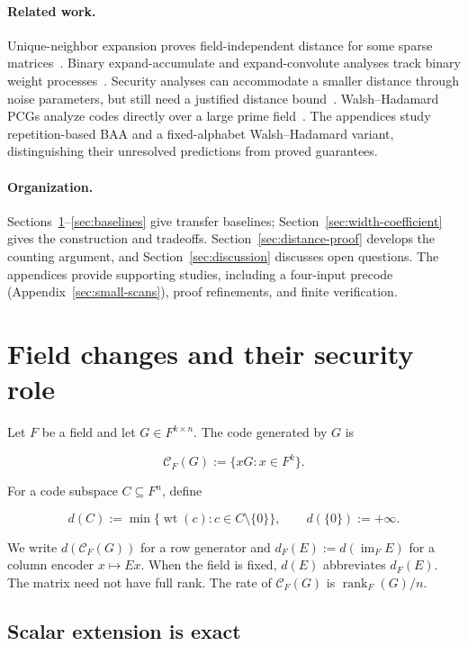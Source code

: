 \documentclass[runningheads,envcountsame,envcountsect]{llncs}
\newcommand{\wt}{\operatorname{wt}}
\newcommand{\rank}{\operatorname{rank}}
\newcommand{\cC}{\mathcal C}
\begin{document}
\paragraph{Related work.}
Unique-neighbor expansion proves
field-independent distance for some sparse matrices~\cite{silver21}.
Binary expand-accumulate and expand-convolute analyses track binary weight
processes~\cite{ea22,ec23}. Security analyses can accommodate a smaller
distance through noise parameters, but still need a justified distance
bound~\cite{silver21,stationary25}. Walsh--Hadamard PCGs analyze codes
directly over a large prime field~\cite{wht26}. The appendices study
repetition-based BAA and a fixed-alphabet Walsh--Hadamard variant, distinguishing
their unresolved predictions from proved guarantees.

\paragraph{Organization.}
Sections~\ref{sec:fields}--\ref{sec:baselines} give transfer baselines;
Section~\ref{sec:width-coefficient} gives the construction and tradeoffs.
Section~\ref{sec:distance-proof} develops the counting argument, and
Section~\ref{sec:discussion} discusses open questions. The appendices
provide supporting studies, including a four-input precode
(Appendix~\ref{sec:small-scans}), proof refinements, and finite
verification.

\section{Field changes and their security role}\label{sec:fields}

Let $F$ be a field and let $G\in F^{k\times n}$.  The code generated by $G$ is

\[
  \cC_F(G):=\{xG:x\in F^k\}.
\]

For a code subspace $C\subseteq F^n$, define

\[
  d(C):=\min\{\wt(c):c\in C\setminus\{0\}\},
  \qquad d(\{0\}):=+\infty.
\]

We write $d(\cC_F(G))$ for a row generator and
$d_F(E):=d(\operatorname{im}_F E)$ for a column encoder $x\mapsto Ex$.
When the field is fixed, $d(E)$ abbreviates $d_F(E)$.
The matrix need not have full rank. The rate of $\cC_F(G)$ is
$\rank_F(G)/n$.

\subsection{Scalar extension is exact}
\end{document}

